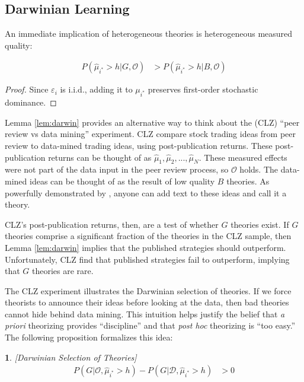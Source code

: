 \documentclass[12pt,english]{article}
\theoremstyle{plain}
\theoremstyle{plain}
\newtheorem{prop}[thm]{\protect\propositionname}
\providecommand{\propositionname}{Proposition}
\providecommand{\propositionname}{Proposition}
\begin{document}
 

\subsection{Darwinian Learning}

An immediate implication of heterogeneous theories is heterogeneous measured quality:
\begin{lemma}
    \label{lem:darwin}
    \begin{align}
        P\left(\hat{\mu}_{i^{\ast}}>h|G,\mathcal{O}\right) 
        &>
        P\left(\hat{\mu}_{i^{\ast}}>h|B,\mathcal{O}\right)
    \end{align}
\end{lemma}
\begin{proof}
    Since $\varepsilon_{i}$ is i.i.d., adding it to $\mu_{i^{\ast}}$ preserves first-order stochastic dominance.
\end{proof}

Lemma \ref{lem:darwin} provides an alternative way to think about the \citet{chen2022peer} (CLZ) ``peer review vs data mining'' experiment. CLZ compare stock trading ideas from peer review to data-mined trading ideas, using post-publication returns. These post-publication returns can be thought of as $\hat{\mu}_{1}, \hat{\mu}_{2},...,\hat{\mu}_{N}$. These measured effects were not part of the data input in the peer review process, so $\mathcal{O}$ holds. The data-mined ideas can be thought of as the result of low quality $B$ theories. As powerfully demonstrated by \citet{novy2025ai}, anyone can add text to these ideas and call it a theory. 

CLZ's post-publication returns, then, are a test of whether $G$ theories exist. If $G$ theories comprise a significant fraction of the theories in the CLZ sample, then Lemma \ref{lem:darwin} implies that the published strategies should outperform. Unfortunately, CLZ find that published strategies fail to outperform, implying that $G$ theories are rare. 


The CLZ experiment illustrates the Darwinian selection of theories. If we force theorists to announce their ideas before looking at the data, then bad theories cannot hide  behind data mining.  This intuition helps justify the belief that \emph{a priori} theorizing provides ``discipline'' and that \emph{post hoc} theorizing is ``too easy.''  The following proposition formalizes this idea:
\begin{prop}\label{prop:darwin}
{[}Darwinian Selection of Theories{]} 
\begin{align*}
P\left(G|\mathcal{O},\hat{\mu}_{i^{\ast}}>h\right)-P\left(G|\mathcal{\mathcal{D}},\hat{\mu}_{i^{\ast}}>h\right) & >0
\end{align*}
\end{prop}
\end{document}
